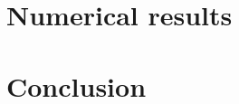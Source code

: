 \documentclass[
fontsize=11pt,
paper=a4,
numbers=noenddot
]{scrartcl}
\begin{document}



\section{Numerical results}\label{sec:numerics}

\section{Conclusion}
\end{document}
